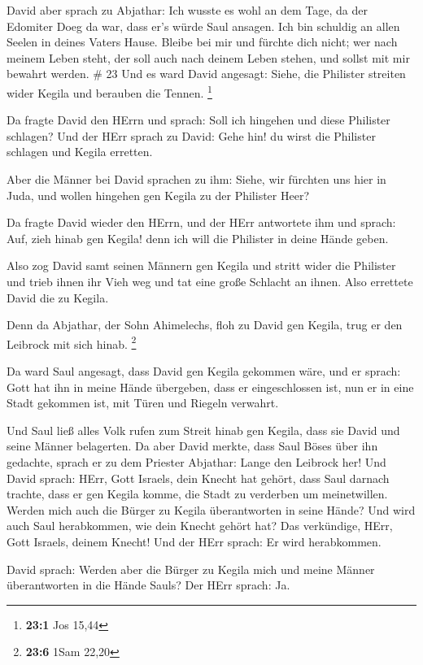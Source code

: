  David aber sprach zu Abjathar: Ich wusste es wohl an dem
Tage, da der Edomiter Doeg da war, dass er's würde Saul ansagen. Ich bin
schuldig an allen Seelen in deines Vaters Hause.  Bleibe
bei mir und fürchte dich nicht; wer nach meinem Leben steht, der soll
auch nach deinem Leben stehen, und sollst mit mir bewahrt werden. \# 23
 Und es ward David angesagt: Siehe, die Philister streiten
wider Kegila und berauben die Tennen. \footnote{\textbf{23:1} Jos 15,44}

 Da fragte David den HErrn und sprach: Soll ich hingehen und
diese Philister schlagen? Und der HErr sprach zu David: Gehe hin! du
wirst die Philister schlagen und Kegila erretten.

 Aber die Männer bei David sprachen zu ihm: Siehe, wir
fürchten uns hier in Juda, und wollen hingehen gen Kegila zu der
Philister Heer?

 Da fragte David wieder den HErrn, und der HErr antwortete
ihm und sprach: Auf, zieh hinab gen Kegila! denn ich will die Philister
in deine Hände geben.

 Also zog David samt seinen Männern gen Kegila und stritt
wider die Philister und trieb ihnen ihr Vieh weg und tat eine große
Schlacht an ihnen. Also errettete David die zu Kegila.

 Denn da Abjathar, der Sohn Ahimelechs, floh zu David gen
Kegila, trug er den Leibrock mit sich hinab. \footnote{\textbf{23:6}
  1Sam 22,20}

 Da ward Saul angesagt, dass David gen Kegila gekommen wäre,
und er sprach: Gott hat ihn in meine Hände übergeben, dass er
eingeschlossen ist, nun er in eine Stadt gekommen ist, mit Türen und
Riegeln verwahrt.

 Und Saul ließ alles Volk rufen zum Streit hinab gen Kegila,
dass sie David und seine Männer belagerten.  Da aber David
merkte, dass Saul Böses über ihn gedachte, sprach er zu dem Priester
Abjathar: Lange den Leibrock her!  Und David sprach: HErr,
Gott Israels, dein Knecht hat gehört, dass Saul darnach trachte, dass er
gen Kegila komme, die Stadt zu verderben um meinetwillen. 
Werden mich auch die Bürger zu Kegila überantworten in seine Hände? Und
wird auch Saul herabkommen, wie dein Knecht gehört hat? Das verkündige,
HErr, Gott Israels, deinem Knecht! Und der HErr sprach: Er wird
herabkommen.

 David sprach: Werden aber die Bürger zu Kegila mich und
meine Männer überantworten in die Hände Sauls? Der HErr sprach: Ja.

